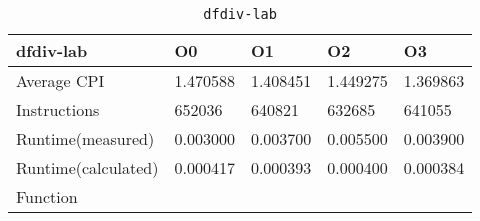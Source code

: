 \begin{table}[ht!]
\centering
\caption{\texttt{dfdiv-lab}}
\label{tab:dfdiv-lab}
\begin{tabular}{|l|l|l|l|l|}
\hline
\textbf{dfdiv-lab}	&	\textbf{O0}	&	\textbf{O1}	&	\textbf{O2}	&	\textbf{O3}	\\\hline\hline
Average CPI	&	1.470588	&	1.408451	&	1.449275	&	1.369863	\\\hline
Instructions	&	652036	&	640821	&	632685	&	641055	\\\hline
Runtime(measured)	&	0.003000	&	0.003700	&	0.005500	&	0.003900	\\\hline
Runtime(calculated)	&	0.000417	&	0.000393	&	0.000400	&	0.000384	\\\hline
Function	&		&		&		&		\\\hline
\end{tabular}
\end{table}
